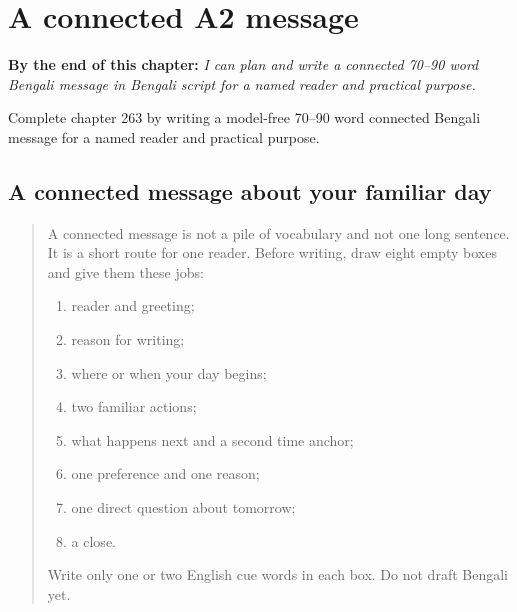 
\chapter{A connected A2 message}
\label{ch:bn-a-connected-a2-message}

\begin{chapteropening}
\textbf{By the end of this chapter:} \emph{I can plan and write a connected 70–90 word Bengali message in Bengali script for a named reader and practical purpose.}

Complete chapter 263 by writing a model-free 70–90 word connected Bengali message for a named reader and practical purpose.
\end{chapteropening}

\section[(connected A2 writing)]{A connected message about your familiar day}

\label{lesson:BN-W263-a2-connected-composition}



\begin{quote}
A connected message is not a pile of vocabulary and not one long sentence. It is a short route for one reader. Before writing, draw eight empty boxes and give them these jobs:

\begin{enumerate}
\raggedright
  \item reader and greeting;
  \item reason for writing;
  \item where or when your day begins;
  \item two familiar actions;
  \item what happens next and a second time anchor;
  \item one preference and one reason;
  \item one direct question about tomorrow;
  \item a close.
\end{enumerate}

Write only one or two English cue words in each box. Do not draft Bengali yet.
\end{quote}

